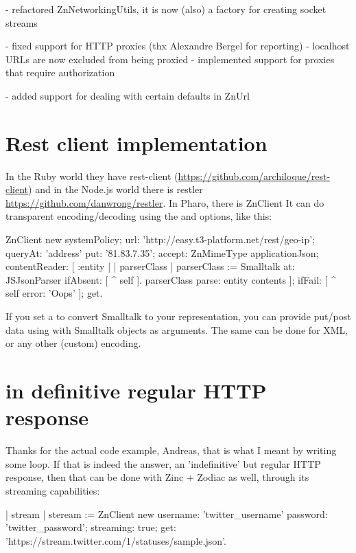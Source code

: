 \documentclass[a4paper,10pt,twoside]{book}
\begin{document}
- refactored ZnNetworkingUtils, it is now (also) a factory for creating socket streams


- fixed support for HTTP proxies (thx Alexandre Bergel for reporting)
- localhost URLs are now excluded from being proxied
- implemented support for proxies that require authorization

- added support for dealing with certain defaults in ZnUrl


\section{Rest client implementation}
In the Ruby world they have rest-client (\url{https://github.com/archiloque/rest-client}) and in
the Node.js world there is restler \url{https://github.com/danwrong/restler}. In Pharo, there is ZnClient
It can do transparent encoding/decoding using the  and  options, like this:

\begin{code}
ZnClient new
	systemPolicy;
	url: 'http://easy.t3-platform.net/rest/geo-ip';
	queryAt: 'address' put: '81.83.7.35';
	accept: ZnMimeType applicationJson;
	contentReader: [ :entity | | parserClass |
		parserClass := Smalltalk at:  JSJsonParser ifAbsent: [ ^ self ].
		parserClass parse: entity contents ];
	ifFail: [ ^ self error: 'Oops' ];
	get.
\end{code}	

If you set a  to convert Smalltalk to your representation, you can provide put/post data using  with Smalltalk objects as arguments. The same can be done for XML, or any other (custom) encoding.



\section{in definitive regular HTTP response}
Thanks for the actual code example, Andreas, that is what I meant by writing some loop. If that is indeed the answer, an 'indefinitive' but regular HTTP response, then that can be done with Zinc + Zodiac as well, through its streaming capabilities: 

\begin{code}
| stream |
steream := ZnClient new
	username: 'twitter_username' password: 'twitter_password';
	streaming: true;
	get: 'https://stream.twitter.com/1/statuses/sample.json'.
\end{code}
\end{document}
